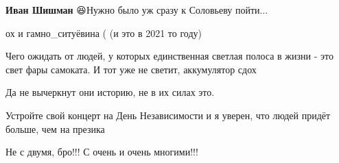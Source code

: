 \begin{itemize}
\begin{itemize}
\textbf{Иван Шишман} 😆Нужно было уж сразу к Соловьеву пойти...
\end{itemize}

 
ох и гамно\_ситуёвина (
(и это в 2021 то году)

 
Чего ожидать от людей, у которых единственная светлая полоса в жизни - это свет фары самоката. И тот уже не светит, аккумулятор сдох

 
Да не вычеркнут они историю, не в их силах это.

 
Устройте свой концерт на День Независимости и я уверен, что людей придёт больше, чем на презика

 
Не с двумя, бро!!! С очень и очень многими!!!

\begin{itemize}
 

\end{itemize}
\end{itemize}
